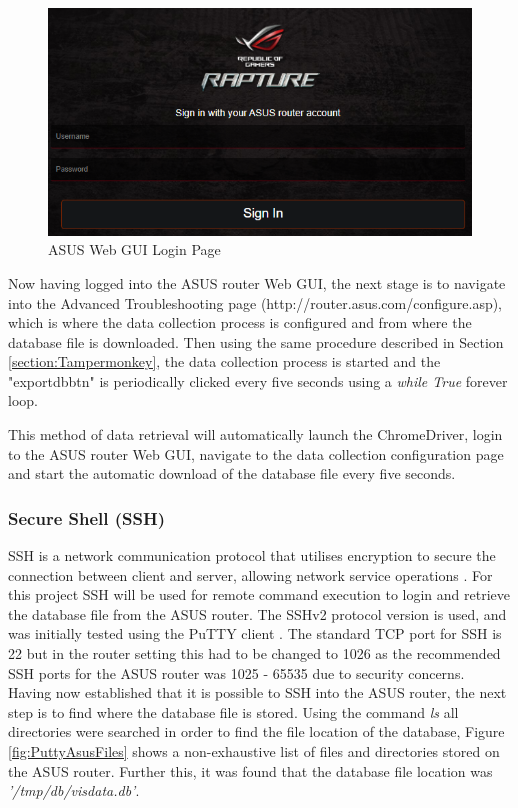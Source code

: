 \begin{figure}[ht]
    \centering
    \includegraphics[width=1\linewidth]{pages/Chapter4/Chapter 4 Images/ASUSLoginPage.PNG}
    \caption{ASUS Web GUI Login Page}
    \label{fig:ASUSLoginPage}
\end{figure}

Now having logged into the ASUS router Web GUI, the next stage is to navigate into the Advanced Troubleshooting page (http://router.asus.com/configure.asp), which is where the data collection process is configured and from where the database file is downloaded. Then using the same procedure described in Section \ref{section:Tampermonkey}, the data collection process is started and the "exportdbbtn" is periodically clicked every five seconds using a \textit{while True} forever loop.

This method of data retrieval will automatically launch the ChromeDriver, login to the ASUS router Web GUI, navigate to the data collection configuration page and start the automatic download of the database file every five seconds. 


\subsubsection{Secure Shell (SSH)}

SSH is a network communication protocol that utilises encryption to secure the connection between client and server, allowing network service operations \cite{ssh}. For this project SSH will be used for remote command execution to login and retrieve the database file from the ASUS router. The SSHv2 protocol version is used, and was initially tested using the PuTTY client \cite{putty}. The standard TCP port for SSH is 22 but in the router setting this had to be changed to 1026 as the recommended SSH ports for the ASUS router was 1025 - 65535 due to security concerns. Having now established that it is possible to SSH into the ASUS router, the next step is to find where the database file is stored. Using the command \textit{ls} all directories were searched in order to find the file location of the database, Figure \ref{fig:PuttyAsusFiles} shows a non-exhaustive list of files and directories stored on the ASUS router. Further this, it was found that the database file location was \textit{'/tmp/db/visdata.db'}.

